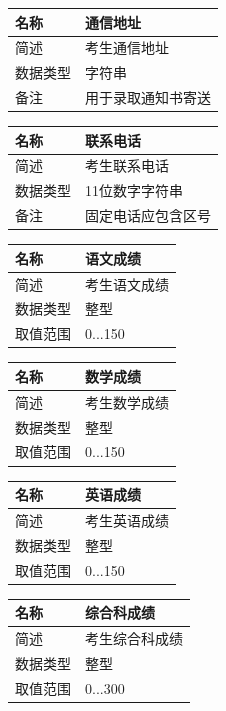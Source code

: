 \documentclass[CJK,utf8]{ctexrep}
\begin{document}
\begin{tabularx}{0.85\textwidth}{|l|X|}
	\hline
	\textbf{名称} & \textbf{通信地址} \\
	\hline
	简述 & 考生通信地址 \\
	\hline
	数据类型 & 字符串 \\
	\hline
	备注 & 用于录取通知书寄送 \\
	\hline
\end{tabularx}

\begin{tabularx}{0.85\textwidth}{|l|X|}
	\hline
	\textbf{名称} & \textbf{联系电话} \\
	\hline
	简述 & 考生联系电话 \\
	\hline
	数据类型 & 11位数字字符串 \\
	\hline
	备注 & 固定电话应包含区号 \\
	\hline
\end{tabularx}

\begin{tabularx}{0.85\textwidth}{|l|X|}
	\hline
	\textbf{名称} & \textbf{语文成绩} \\
	\hline
	简述 & 考生语文成绩 \\
	\hline
	数据类型 & 整型 \\
	\hline
	取值范围 & 0...150 \\
	\hline
\end{tabularx}

\begin{tabularx}{0.85\textwidth}{|l|X|}
	\hline
	\textbf{名称} & \textbf{数学成绩} \\
	\hline
	简述 & 考生数学成绩 \\
	\hline
	数据类型 & 整型 \\
	\hline
	取值范围 & 0...150 \\
	\hline
\end{tabularx}

\begin{tabularx}{0.85\textwidth}{|l|X|}
	\hline
	\textbf{名称} & \textbf{英语成绩} \\
	\hline
	简述 & 考生英语成绩 \\
	\hline
	数据类型 & 整型 \\
	\hline
	取值范围 & 0...150 \\
	\hline
\end{tabularx}

\begin{tabularx}{0.85\textwidth}{|l|X|}
	\hline
	\textbf{名称} & \textbf{综合科成绩} \\
	\hline
	简述 & 考生综合科成绩 \\
	\hline
	数据类型 & 整型 \\
	\hline
	取值范围 & 0...300 \\
	\hline
\end{tabularx}
\end{document}
